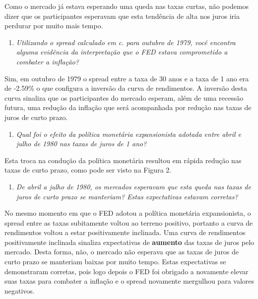 \documentclass[]{article}
\providecommand{\tightlist}{%
  \setlength{\itemsep}{0pt}\setlength{\parskip}{0pt}}
\begin{document}
Como o mercado já estava esperando uma queda nas taxas curtas, não
podemos dizer que os participantes esperavam que esta tendência de alta
nos juros iria perdurar por muito mais tempo.

\begin{enumerate}
\def\labelenumi{\alph{enumi}.}
\setcounter{enumi}{4}
\tightlist
\item
  \emph{Utilizando o spread calculado em c. para outubro de 1979, você
  encontra alguma evidência da interpretação que o FED estava
  comprometido a combater a inflação?}
\end{enumerate}

Sim, em outubro de 1979 o spread entre a taxa de 30 anos e a taxa de 1
ano era de -2.59\% o que configura a inversão da curva de rendimentos. A
inversão desta curva sinaliza que os participantes do mercado esperam,
além de uma recessão futura, uma redução da inflação que será
acompanhada por redução nas taxas de juros de curto prazo.

\begin{enumerate}
\def\labelenumi{\alph{enumi}.}
\setcounter{enumi}{5}
\tightlist
\item
  \emph{Qual foi o efeito da política monetária expansionista adotada
  entre abril e julho de 1980 nas taxas de juros de 1 ano?}
\end{enumerate}

Esta troca na condução da política monetária resultou em rápida redução
nas taxas de curto prazo, como pode ser visto na Figura 2.

\begin{enumerate}
\def\labelenumi{\alph{enumi}.}
\setcounter{enumi}{6}
\tightlist
\item
  \emph{De abril a julho de 1980, os mercados esperavam que esta queda
  nas taxas de juros de curto prazo se manteriam? Estas expectativas
  estavam corretas?}
\end{enumerate}

No mesmo momento em que o FED adotou a política monetária expansionista,
o spread entre as taxas subitamente voltou ao terreno positivo, portanto
a curva de rendimentos voltou a estar positivamente inclinada. Uma curva
de rendimentos positivamente inclinada sinaliza expectativas de
\textbf{aumento} das taxas de juros pelo mercado. Desta forma, não, o
mercado não esperava que as taxas de juros de curto prazo se manteriam
baixas por muito tempo. Estas expectativas se demonstraram corretas,
pois logo depois o FED foi obrigado a novamente elevar suas taxas para
combater a inflação e o spread novamente mergulhou para valores
negativos.
\end{document}
